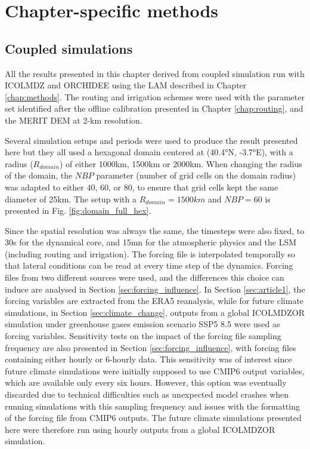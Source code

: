 \clearpage

\section{Chapter-specific methods}
\subsection{Coupled simulations}
All the results presented in this chapter derived from coupled simulation run with ICOLMDZ and ORCHIDEE using the LAM described in Chapter \ref{chap:methods}. The routing and irrigation schemes were used with the parameter set identified after the offline calibration presented in Chapter \ref{chap:routing}, and the MERIT DEM at 2-km resolution.

Several simulation setups and periods were used to produce the result presented here but they all used a hexagonal domain centered at (40.4°N, -3.7°E), with a radius ($R_{domain}$) of either 1000km, 1500km or 2000km. When changing the radius of the domain, the $NBP$ parameter (number of grid cells on the domain radius) was adapted to either 40, 60, or 80, to ensure that grid cells kept the same diameter of 25km. The setup with a $R_{domain}=1500 km$ and $NBP=60$ is presented in Fig. \ref{fig:domain_full_hex}. 
 
Since the spatial resolution was always the same, the timesteps were also fixed, to 30s for the dynamical core, and 15mn for the atmospheric physics and the LSM (including routing and irrigation).
The forcing file is interpolated temporally so that lateral conditions can be read at every time step of the dynamics.
Forcing files from two different sources were used, and the differences this choice can induce are analysed in Section \ref{sec:forcing_influence}. In Section \ref{sec:article1}, the forcing variables are extracted from the ERA5 reanalysis, while for future climate simulations, in Section \ref{sec:climate_change}, outputs from a global ICOLMDZOR simulation under greenhouse gases emission scenario SSP5 8.5 were used as forcing variables.
Sensitivity tests on the impact of the forcing file sampling frequency are also presented in Section \ref{sec:forcing_influence}, with forcing files containing either hourly or 6-hourly data.
This sensitivity was of interest since future climate simulations were initially supposed to use CMIP6 output variables, which are available only every six hours. However, this option was eventually discarded due to technical difficulties such as unexpected model crashes when running simulations with this sampling frequency and issues with the formatting of the forcing file from CMIP6 outputs. The future climate simulations presented here were therefore run using hourly outputs from a global ICOLMDZOR simulation.


